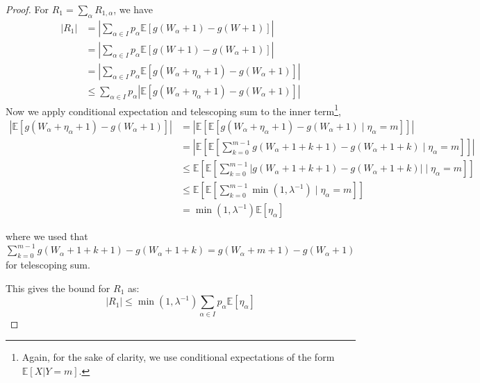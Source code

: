 \documentclass{article}
\begin{document}
\begin{proof}
    For $R_1=\sum_\alpha R_{1,\alpha}$, we have
    \begin{align*}
        |R_1| &= \left|\sum_{\alpha \in I} p_\alpha \mathbb{E}[g(W_\alpha+1) - g(W+1)]\right| \\
        &= \left|\sum_{\alpha \in I} p_\alpha \mathbb{E}[g(W+1) - g(W_\alpha+1)]\right| \\
        &= \left|\sum_{\alpha \in I} p_\alpha \mathbb{E}[g(W_\alpha + \eta_\alpha +1) - g(W_\alpha+1)]\right|\\
        &\leq \sum_{\alpha \in I} p_\alpha |\mathbb{E}[g(W_\alpha + \eta_\alpha +1) - g(W_\alpha+1)]|
    \end{align*}
    Now we apply conditional expectation and telescoping sum to the inner term\footnote{Again, for the sake of clarity, we use conditional expectations of the form $\mathbb{E}[X|Y=m]$.},
    \begin{align*}
        |\mathbb{E}[g(W_\alpha + \eta_\alpha +1) - g(W_\alpha+1)]| &= 
        \left|\mathbb{E}\left[\mathbb{E}[g(W_\alpha + \eta_\alpha +1) - g(W_\alpha+1)\mid \eta_\alpha = m]\right]\right|\\
        &= \left|\mathbb{E}\left[\mathbb{E}[\sum_{k=0}^{m-1} g(W_\alpha + 1 + k+1) - g(W_\alpha + 1 + k)\mid \eta_\alpha = m]\right]\right|\\
        &\leq \mathbb{E}\left[\mathbb{E}[\sum_{k=0}^{m-1} |g(W_\alpha + 1 + k+1) - g(W_\alpha + 1 + k)|\mid \eta_\alpha = m]\right]\\
        &\leq \mathbb{E}\left[\mathbb{E}[\sum_{k=0}^{m-1} \min (1, \lambda^{-1})\mid \eta_\alpha = m]\right]\\
        &= \min (1, \lambda^{-1}) \mathbb{E}[ \eta_\alpha]
    \end{align*}

    where we used that $\sum_{k=0}^{m-1} g(W_\alpha + 1 + k+1) - g(W_\alpha + 1 + k) = g(W_\alpha +m+1)- g(W_\alpha+1)$ for telescoping sum.

    This gives the bound for $R_1$ as:
    \begin{equation*}
        |R_1| \leq \min (1, \lambda^{-1}) \sum_{\alpha \in I} p_\alpha \mathbb{E}[ \eta_\alpha]
    \end{equation*}


\end{proof}
\end{document}
